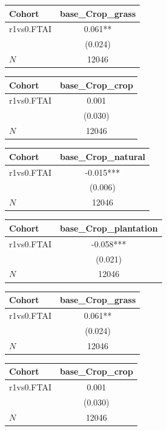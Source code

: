 {
\def\sym#1{\ifmmode^{#1}\else\(^{#1}\)\fi}
\begin{tabular}{l*{1}{c}}
\toprule
Cohort    &base\_Crop\_grass   \\
\midrule
r1vs0.FTAI&    0.061** \\
          &  (0.024)   \\
\midrule
\(N\)     &    12046   \\
\bottomrule
\end{tabular}
}
{
\def\sym#1{\ifmmode^{#1}\else\(^{#1}\)\fi}
\begin{tabular}{l*{1}{c}}
\toprule
Cohort    &base\_Crop\_crop   \\
\midrule
r1vs0.FTAI&    0.001   \\
          &  (0.030)   \\
\midrule
\(N\)     &    12046   \\
\bottomrule
\end{tabular}
}
{
\def\sym#1{\ifmmode^{#1}\else\(^{#1}\)\fi}
\begin{tabular}{l*{1}{c}}
\toprule
Cohort    &base\_Crop\_natural   \\
\midrule
r1vs0.FTAI&   -0.015***\\
          &  (0.006)   \\
\midrule
\(N\)     &    12046   \\
\bottomrule
\end{tabular}
}
{
\def\sym#1{\ifmmode^{#1}\else\(^{#1}\)\fi}
\begin{tabular}{l*{1}{c}}
\toprule
Cohort    &base\_Crop\_plantation   \\
\midrule
r1vs0.FTAI&   -0.058***\\
          &  (0.021)   \\
\midrule
\(N\)     &    12046   \\
\bottomrule
\end{tabular}
}
{
\def\sym#1{\ifmmode^{#1}\else\(^{#1}\)\fi}
\begin{tabular}{l*{1}{c}}
\toprule
Cohort    &base\_Crop\_grass   \\
\midrule
r1vs0.FTAI&    0.061** \\
          &  (0.024)   \\
\midrule
\(N\)     &    12046   \\
\bottomrule
\end{tabular}
}
{
\def\sym#1{\ifmmode^{#1}\else\(^{#1}\)\fi}
\begin{tabular}{l*{1}{c}}
\toprule
Cohort    &base\_Crop\_crop   \\
\midrule
r1vs0.FTAI&    0.001   \\
          &  (0.030)   \\
\midrule
\(N\)     &    12046   \\
\bottomrule
\end{tabular}
}
